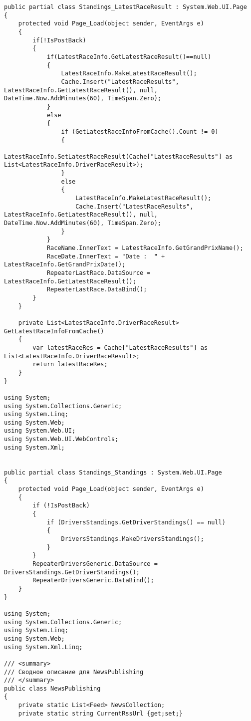 \documentclass[14pt,a4paper]{extreport}
\begin{document}
\begin{landscape}
\begin{lstlisting}
public partial class Standings_LatestRaceResult : System.Web.UI.Page
{
    protected void Page_Load(object sender, EventArgs e)
    {
        if(!IsPostBack)
        {
            if(LatestRaceInfo.GetLatestRaceResult()==null)
            {
                LatestRaceInfo.MakeLatestRaceResult();
                Cache.Insert("LatestRaceResults", LatestRaceInfo.GetLatestRaceResult(), null, DateTime.Now.AddMinutes(60), TimeSpan.Zero);
            }
            else
            {
                if (GetLatestRaceInfoFromCache().Count != 0)
                {
                    LatestRaceInfo.SetLatestRaceResult(Cache["LatestRaceResults"] as List<LatestRaceInfo.DriverRaceResult>);
                }
                else
                {
                    LatestRaceInfo.MakeLatestRaceResult();
                    Cache.Insert("LatestRaceResults", LatestRaceInfo.GetLatestRaceResult(), null, DateTime.Now.AddMinutes(60), TimeSpan.Zero);
                }
            }
            RaceName.InnerText = LatestRaceInfo.GetGrandPrixName();
            RaceDate.InnerText = "Date :  " + LatestRaceInfo.GetGrandPrixDate();
            RepeaterLastRace.DataSource = LatestRaceInfo.GetLatestRaceResult();
            RepeaterLastRace.DataBind();
        }
    }

    private List<LatestRaceInfo.DriverRaceResult> GetLatestRaceInfoFromCache()
    {
        var latestRaceRes = Cache["LatestRaceResults"] as List<LatestRaceInfo.DriverRaceResult>;
        return latestRaceRes;
    }
}

using System;
using System.Collections.Generic;
using System.Linq;
using System.Web;
using System.Web.UI;
using System.Web.UI.WebControls;
using System.Xml;


public partial class Standings_Standings : System.Web.UI.Page
{
    protected void Page_Load(object sender, EventArgs e)
    {
        if (!IsPostBack)
        {
            if (DriversStandings.GetDriverStandings() == null)
            {
                DriversStandings.MakeDriversStandings();
            }
        }
        RepeaterDriversGeneric.DataSource = DriversStandings.GetDriverStandings();
        RepeaterDriversGeneric.DataBind();       
    }
}

using System;
using System.Collections.Generic;
using System.Linq;
using System.Web;
using System.Xml.Linq;

/// <summary>
/// Сводное описание для NewsPublishing
/// </summary>
public class NewsPublishing
{
    private static List<Feed> NewsCollection;
    private static string CurrentRssUrl {get;set;}


\end{lstlisting}
\end{landscape}
\end{document}
